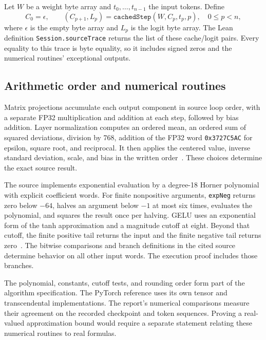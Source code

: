\documentclass[11pt]{article}
\newcommand{\code}[1]{\texttt{#1}}
\begin{document}
Let $W$ be a weight byte array and $t_0,\ldots,t_{n-1}$ the input tokens.  Define
\begin{equation}\label{eq:recurrence}
C_0=\epsilon,\qquad
(C_{p+1},L_p)=\code{cachedStep}(W,C_p,t_p,p),\quad 0\leq p<n,
\end{equation}
where $\epsilon$ is the empty byte array and $L_p$ is the logit byte array.  The Lean definition \code{Session.sourceTrace} returns the list of these cache/logit pairs.  Every equality to this trace is byte equality, so it includes signed zeros and the numerical routines' exceptional outputs.

\subsection{Arithmetic order and numerical routines}

Matrix projections accumulate each output component in source loop order, with a separate FP32 multiplication and addition at each step, followed by bias addition.  Layer normalization computes an ordered mean, an ordered sum of squared deviations, division by 768, addition of the FP32 word \code{0x3727C5AC} for epsilon, square root, and reciprocal.  It then applies the centered value, inverse standard deviation, scale, and bias in the written order~\cite{kernels}.  These choices determine the exact source result.

The source implements exponential evaluation by a degree-18 Horner polynomial with explicit coefficient words.  For finite nonpositive arguments, \code{expNeg} returns zero below $-64$, halves an argument below $-1$ at most six times, evaluates the polynomial, and squares the result once per halving.  GELU uses an exponential form of the tanh approximation and a magnitude cutoff at eight.  Beyond that cutoff, the finite positive tail returns the input and the finite negative tail returns zero~\cite{numerics}.  The bitwise comparisons and branch definitions in the cited source determine behavior on all other input words.  The execution proof includes those branches.

The polynomial, constants, cutoff tests, and rounding order form part of the algorithm specification.  The PyTorch reference uses its own tensor and transcendental implementations.  The report's numerical comparisons measure their agreement on the recorded checkpoint and token sequences.  Proving a real-valued approximation bound would require a separate statement relating these numerical routines to real formulas.
\end{document}

